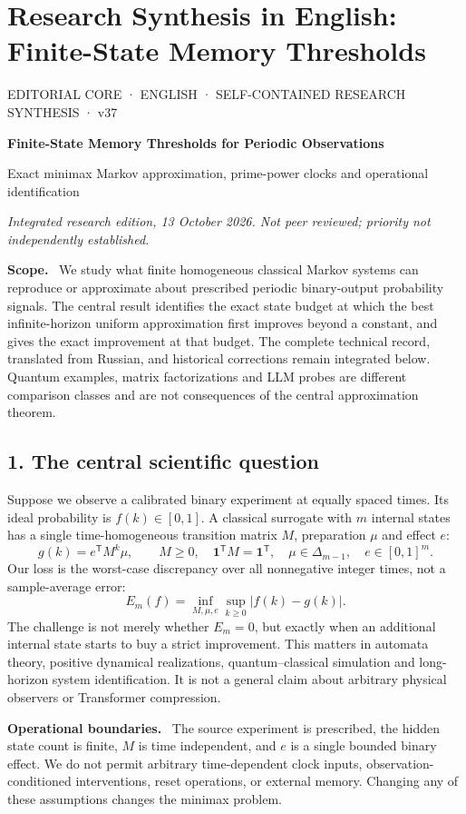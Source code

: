 \documentclass[11pt,a4paper,oneside]{book}
\newcommand{\one}{\mathbf 1}\newcommand{\ii}{\mathrm i}\newcommand{\dd}{\mathrm d}
\newcommand{\note}[1]{\par\medskip\noindent\textbf{#1}\ }
\begin{document}
\chapter*{Research Synthesis in English: Finite-State Memory Thresholds}
\begin{center}
{\small\sffamily EDITORIAL CORE · ENGLISH · SELF-CONTAINED RESEARCH SYNTHESIS · v37}\par\medskip
{\Large\bfseries Finite-State Memory Thresholds for Periodic Observations}\par\smallskip
Exact minimax Markov approximation, prime-power clocks and operational identification\par\smallskip
\textit{Integrated research edition, 13 October 2026. Not peer reviewed; priority not independently established.}
\end{center}
\note{Scope.} We study what finite homogeneous classical Markov systems can reproduce or approximate about prescribed periodic binary-output probability signals. The central result identifies the exact state budget at which the best infinite-horizon uniform approximation first improves beyond a constant, and gives the exact improvement at that budget. The complete technical record, translated from Russian, and historical corrections remain integrated below. Quantum examples, matrix factorizations and LLM probes are different comparison classes and are not consequences of the central approximation theorem.
\section*{1. The central scientific question}
Suppose we observe a calibrated binary experiment at equally spaced times. Its ideal probability is $f(k)\in[0,1]$. A classical surrogate with $m$ internal states has a single time-homogeneous transition matrix $M$, preparation $\mu$ and effect $e$:
\begin{equation}g(k)=e^{\mathsf T}M^k\mu,\qquad M\ge0,\quad\one^{\mathsf T}M=\one^{\mathsf T},\quad\mu\in\Delta_{m-1},\quad e\in[0,1]^m.\tag{1}\end{equation}
Our loss is the worst-case discrepancy over all nonnegative integer times, not a sample-average error:
\begin{equation}E_m(f)=\inf_{M,\mu,e}\sup_{k\ge0}|f(k)-g(k)|.\tag{2}\end{equation}
The challenge is not merely whether $E_m=0$, but exactly when an additional internal state starts to buy a strict improvement. This matters in automata theory, positive dynamical realizations, quantum--classical simulation and long-horizon system identification. It is not a general claim about arbitrary physical observers or Transformer compression.
\note{Operational boundaries.} The source experiment is prescribed, the hidden state count is finite, $M$ is time independent, and $e$ is a single bounded binary effect. We do not permit arbitrary time-dependent clock inputs, observation-conditioned interventions, reset operations, or external memory. Changing any of these assumptions changes the minimax problem.
\end{document}
